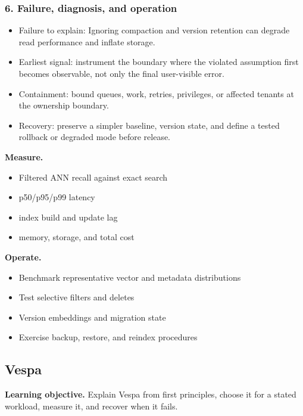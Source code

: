 \subsubsection*{6. Failure, diagnosis, and operation}
\begin{itemize}
\item Failure to explain: Ignoring compaction and version retention can degrade read performance and inflate storage.
\item Earliest signal: instrument the boundary where the violated assumption first becomes observable, not only the final user-visible error.
\item Containment: bound queues, work, retries, privileges, or affected tenants at the ownership boundary.
\item Recovery: preserve a simpler baseline, version state, and define a tested rollback or degraded mode before release.
\end{itemize}
\textbf{Measure.}\begin{itemize}
\item Filtered ANN recall against exact search
\item p50/p95/p99 latency
\item index build and update lag
\item memory, storage, and total cost
\end{itemize}
\textbf{Operate.}\begin{itemize}
\item Benchmark representative vector and metadata distributions
\item Test selective filters and deletes
\item Version embeddings and migration state
\item Exercise backup, restore, and reindex procedures
\end{itemize}
\subsection{Vespa}
\textbf{Learning objective.} Explain Vespa from first principles, choose it for a stated workload, measure it, and recover when it fails.
